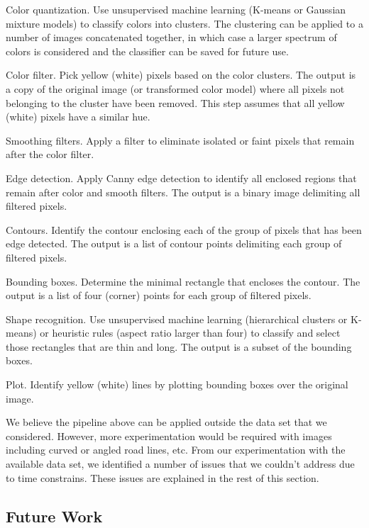 \documentclass{m2pi}
\begin{document}
\begin{enumerate}
    \item Color quantization. Use unsupervised machine learning (K-means or Gaussian mixture models) to classify colors into clusters. The clustering can be applied to a number of images concatenated together, in which case a larger spectrum of colors is considered and the classifier can be saved for future use.
    {\color{red} \item Color filter. Pick yellow (white) pixels based on the color clusters. The output is a copy of the original image (or transformed color model) where all pixels not belonging to the cluster have been removed. This step assumes that all yellow (white) pixels have a similar hue.}
    \item Smoothing filters. Apply a filter to eliminate isolated or faint pixels that remain after the color filter.
    \item Edge detection. Apply Canny edge detection to identify all enclosed regions that remain after color and smooth filters. The output is a binary image delimiting all filtered pixels.
    \item Contours. Identify the contour enclosing each of the group of pixels that has been edge detected. The output is a list of contour points delimiting each group of filtered pixels.
    \item Bounding boxes. Determine the minimal rectangle that encloses the contour. The output is a list of four (corner) points for each group of filtered pixels.
    \item Shape recognition. Use unsupervised machine learning (hierarchical clusters or K-means) or heuristic rules (aspect ratio larger than four) to classify and select those rectangles that are thin and long. The output is a subset of the bounding boxes.
    \item Plot. Identify yellow (white) lines by plotting bounding boxes over the original image.
\end{enumerate}

We believe the pipeline above can be applied outside the data set that we considered. However, more experimentation would be required with images including curved or angled road lines, etc. {\color{red} From our experimentation with the available data set, we identified a number of issues that we couldn't address due to time constrains. These issues are explained in the rest of this section.}

\subsection{Future Work}
\end{document}
